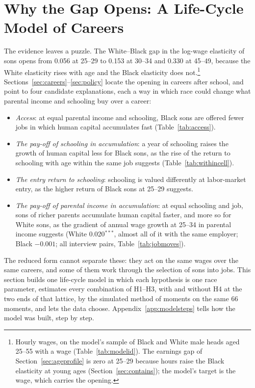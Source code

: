 \section{Why the Gap Opens: A Life-Cycle Model of Careers}\label{sec:model}

The evidence leaves a puzzle. The White--Black gap in the log-wage elasticity of sons opens from 0.056 at 25--29 to
0.153 at 30--34 and 0.330 at 45--49, because the White elasticity rises with age and the Black elasticity does
not.\footnote{Hourly wages, on the model's sample of Black and White male heads aged 25--55 with a wage
(Table~\ref{tab:modelid}). The earnings gap of Section~\ref{sec:ageprofile} is zero at 25--29 because hours raise the
Black elasticity at young ages (Section~\ref{sec:contains}); the model's target is the wage, which carries the
opening.}
Sections~\ref{sec:careers}--\ref{sec:policy} locate the opening in careers after school, and point to four candidate
explanations, each a way in which race could change what parental income and schooling buy over a career:
\begin{itemize}[leftmargin=*, itemsep=0pt]
\item[H1] \textit{Access}: at equal parental income and schooling, Black sons are offered fewer jobs in which human
capital accumulates fast (Table~\ref{tab:access}).
\item[H2] \textit{The pay-off of schooling in accumulation}: a year of schooling raises the growth of human capital less
for Black sons, as the rise of the return to schooling with age within the same job suggests
(Table~\ref{tab:withincell}).
\item[H3] \textit{The entry return to schooling}: schooling is valued differently at labor-market entry, as the higher
return of Black sons at 25--29 suggests.
\item[H4] \textit{The pay-off of parental income in accumulation}: at equal schooling and job, sons of richer parents
accumulate human capital faster, and more so for White sons, as the gradient of annual wage growth at 25--34 in
parental income suggests (White 0.020$^{***}$, almost all of it with the same employer; Black $-0.001$; all
interview pairs, Table~\ref{tab:jobmoves}).
\end{itemize}
The reduced form cannot separate these: they act on the same wages over the same careers, and some of them work through
the selection of sons into jobs. This section builds one life-cycle model in which each hypothesis is one race
parameter, estimates every combination of H1--H3, with and without H4 at the two ends of that lattice, by the simulated
method of moments on the same 66 moments, and lets the data choose. Appendix~\ref{app:modelsteps} tells how the model was built, step by step.

